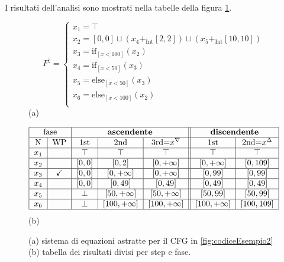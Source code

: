 \begin{example}
I risultati dell'analisi sono mostrati nella tabelle della figura \ref{fig:ris}.
\begin{figure}[H]
\begin{minipage}{\textwidth}
\vspace{1cm}
\[
F^{\natural}=
\begin{cases}
    x_1 = \top \\
    x_2 = [0, 0]\sqcup(x_4 +_{\textrm{Int}} [2, 2])\sqcup(x_5 +_{\textrm{Int}} [10, 10]) \\
    x_3 = \textrm{if}_{[x<100]}(x_2) \\
    x_4 = \textrm{if}_{[x<50]}(x_3) \\
    x_5 = \textrm{else}_{[x<50]}(x_3) \\
    x_6 = \textrm{else}_{[x<100]}(x_2) \\
\end{cases}
\]  
\centering
(a)
\end{minipage}
\begin{minipage}{\textwidth}
    \centering
    \vspace{1cm}
        \[
        \begin{tabular}{|c|c|c|c|c||c|c|c||}
        \hline
        \multicolumn{2}{|c|}{fase} & 
        \multicolumn{3}{c||}{\textbf{ascendente}} & 
        \multicolumn{2}{c|}{\textbf{discendente}}\\
        
        \hline 
        N & WP & 1st & 2nd & 3rd=$x^{\nabla}$ & 1st & 2nd=$x^{\Delta}$  \\
        \hline
        $x_1$ &  &  
            $\top$ & $\top$ & $\top$ & 
            $\top$ & $\top$ \\
        \hline
        $x_2$ &  & 
            $\left[0, 0\right]$ & $\left[0, 2\right]$ & $\left[0, +\infty \right]$ & 
            $\left[0, +\infty \right]$ & $\left[0, 109\right]$ \\
        \hline
        $x_3$ & \checkmark & 
            $\left[0, 0\right]$ & $\left[0, +\infty \right]$ & $\left[0, +\infty \right]$ & 
            $\left[0, 99\right]$ & $\left[0, 99\right]$ \\
        \hline
        $x_4$ &  & 
            $\left[0, 0\right]$ & $\left[0, 49\right]$ & $\left[0, 49\right]$ & 
            $\left[0, 49\right]$ & $\left[0, 49\right]$ \\
        \hline
        $x_5$ &  & 
            $\perp$ & $\left[50, +\infty \right]$ & $\left[50, +\infty \right]$ & 
            $\left[50, 99\right]$ & $\left[50, 99\right]$ \\
        \hline
        $x_6$ &  & 
            $\perp$ & $\left[100, +\infty \right]$ & $\left[100, +\infty \right]$ & 
            $\left[100, +\infty \right]$ & $\left[100, 109\right]$ \\
        \hline
        \end{tabular}
        \]
        (b)
    \end{minipage}
    \caption{(a) sistema di equazioni astratte per il CFG in \ref{fig:codiceEsempio2} (b) tabella dei risultati divisi per step e fase.}
    \label{fig:ris}
\end{figure}
\end{example}
